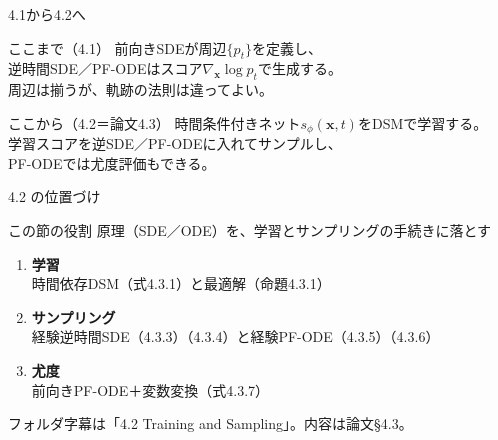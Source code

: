 

\begin{frame}{4.1から4.2へ}
    \begin{block}{ここまで（4.1）}
        前向きSDEが周辺$\{p_t\}$を定義し、\\
        逆時間SDE／PF-ODEはスコア$\nabla_{\bm{x}}\log p_t$で生成する。\\
        周辺は揃うが、軌跡の法則は違ってよい。
    \end{block}
    \begin{block}{ここから（4.2＝論文4.3）}
        時間条件付きネット$s_\phi(\bm{x},t)$をDSMで学習する。\\
        学習スコアを逆SDE／PF-ODEに入れてサンプルし、\\
        PF-ODEでは尤度評価もできる。
    \end{block}
\end{frame}
\asmain
\begin{frame}{4.2 の位置づけ}
    \begin{block}{この節の役割}
        原理（SDE／ODE）を、学習とサンプリングの手続きに落とす
    \end{block}
    \begin{enumerate}
        \item \textbf{学習}\\
        時間依存DSM（式4.3.1）と最適解（命題4.3.1）
        \item \textbf{サンプリング}\\
        経験逆時間SDE（4.3.3）（4.3.4）と経験PF-ODE（4.3.5）（4.3.6）
        \item \textbf{尤度}\\
        前向きPF-ODE＋変数変換（式4.3.7）
    \end{enumerate}
    \vfill
    \footnotesize
    フォルダ字幕は「4.2 Training and Sampling」。内容は論文§4.3。
\end{frame}
